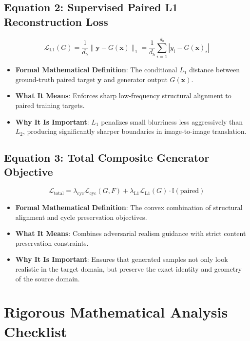 \documentclass[11pt,a4paper]{article}
\theoremstyle{definition}
\begin{document}
\subsection{\textbf{Equation 2: Supervised Paired L1 Reconstruction Loss}}
{\boldmath
\begin{equation}
\mathcal{L}_{\text{L1}}(G) = \frac{1}{d_b} \|\mathbf{y} - G(\mathbf{x})\|_1 = \frac{1}{d_b} \sum_{i=1}^{d_b} |y_i - G(\mathbf{x})_i|
\end{equation}
}
\begin{itemize}
    \item \textbf{Formal Mathematical Definition}:
    The conditional $L_1$ distance between ground-truth paired target $\mathbf{y}$ and generator output $G(\mathbf{x})$.
    \item \textbf{What It Means}:
    Enforces sharp low-frequency structural alignment to paired training targets.
    \item \textbf{Why It Is Important}:
    $L_1$ penalizes small blurriness less aggressively than $L_2$, producing significantly sharper boundaries in image-to-image translation.
\end{itemize}

\subsection{\textbf{Equation 3: Total Composite Generator Objective}}
{\boldmath
\begin{equation}
\mathcal{L}_{\text{total}} = \lambda_{\text{cyc}} \mathcal{L}_{\text{cyc}}(G, F) + \lambda_{\text{L1}} \mathcal{L}_{\text{L1}}(G) \cdot \mathbb{I}(\text{paired})
\end{equation}
}
\begin{itemize}
    \item \textbf{Formal Mathematical Definition}:
    The convex combination of structural alignment and cycle preservation objectives.
    \item \textbf{What It Means}:
    Combines adversarial realism guidance with strict content preservation constraints.
    \item \textbf{Why It Is Important}:
    Ensures that generated samples not only look realistic in the target domain, but preserve the exact identity and geometry of the source domain.
\end{itemize}

\section{Rigorous Mathematical Analysis Checklist}
\end{document}
